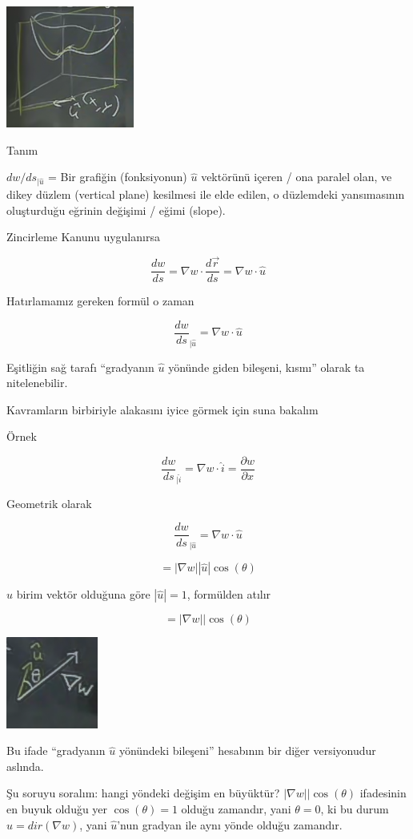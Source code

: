 \documentclass[12pt,fleqn]{article}\usepackage{../../common}
\begin{document}
\includegraphics[height=4cm]{12_7.png}

Tanım

$dw / ds_{|\hat{u}}$ = Bir grafiğin (fonksiyonun) $\hat{u}$ vektörünü içeren /
ona paralel olan, ve dikey düzlem (vertical plane) kesilmesi ile elde edilen, o
düzlemdeki yansımasının oluşturduğu eğrinin değişimi / eğimi (slope).

Zincirleme Kanunu uygulanırsa

$$ \frac{dw}{ds} = \nabla w \cdot \frac{d\vec{r}}{ds} 
= \nabla w \cdot \hat{u}
$$

Hatırlamamız gereken formül o zaman

$$ \frac{dw}{ds}_{|\hat{u}} =  \nabla w \cdot \hat{u} $$

Eşitliğin sağ tarafı ``gradyanın $\hat{u}$ yönünde giden bileşeni, kısmı''
olarak ta nitelenebilir. 

Kavramların birbiriyle alakasını iyice görmek için suna bakalım

Örnek

$$ 
\frac{dw}{ds}_{|\hat{i}} =  \nabla w \cdot \hat{i} = 
\frac{\partial w}{\partial x} $$

Geometrik olarak

$$ \frac{dw}{ds}_{|\hat{u}} =  \nabla w \cdot \hat{u} $$

$$ =  |\nabla w||\hat{u}|\cos(\theta)  $$

$\hat{u}$ birim vektör olduğuna göre $|\hat{u}| = 1$, formülden atılır

$$ =  |\nabla w||\cos(\theta)  $$

\includegraphics[height=3cm]{12_8.png}

Bu ifade ``gradyanın $\hat{u}$ yönündeki bileşeni'' hesabının bir diğer
versiyonudur aslında. 

Şu soruyu soralım: hangi yöndeki değişim en büyüktür? $|\nabla w||\cos(\theta)$
ifadesinin en buyuk olduğu yer $\cos(\theta)=1$ olduğu zamandır, yani $\theta =
0$, ki bu durum $\hat{u} = dir(\nabla w)$, yani $\hat{u}$'nun gradyan ile aynı
yönde olduğu zamandır.
\end{document}
